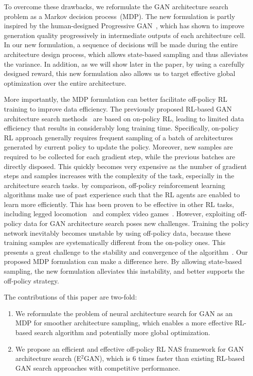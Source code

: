 \documentclass[runningheads]{llncs}
\begin{document}
To overcome these drawbacks, we reformulate the GAN architecture search problem as a Markov decision process~(MDP). The new formulation is partly inspired by the human-designed Progressive GAN~\cite{karras2017progressive}, which has shown to improve generation quality progressively in intermediate outputs of each architecture cell. In our new formulation, a sequence of decisions will be made during the entire architecture design process, which allows state-based sampling and thus alleviates the variance. In addition, as we will show later in the paper, by using a carefully designed reward, this new formulation also allows us to target effective global optimization over the entire architecture.   


More importantly, the MDP formulation can better facilitate off-policy RL training to improve data efficiency. The previously proposed RL-based GAN architecture search methods~\cite{gong2019autogan,wang2019agan} are based on on-policy RL, leading to limited data efficiency that results in considerably long training time. 
Specifically, on-policy RL approach generally requires frequent sampling of a batch of architectures generated by current policy to update the policy.
Moreover, new samples are required to be collected for each gradient step, while the previous batches are directly disposed. This quickly becomes very expensive as the number of gradient steps and samples increases with the complexity of the task, especially in the architecture search tasks. by comparison, off-policy reinforcement learning algorithms make use of past experience such that the RL agents are enabled to learn more efficiently. This has been proven to be effective in other RL tasks, including legged locomotion~\cite{lillicrap2015continuous} and complex video games~\cite{mnih2015human}. However, exploiting off-policy data for GAN architecture search poses new challenges. Training the policy network inevitably becomes unstable by using off-policy data, because these training samples are systematically different from the on-policy ones. This presents a great challenge to the stability and convergence of the algorithm~\cite{bhatnagar2009convergent}. Our proposed MDP formulation can make a difference here. By allowing state-based sampling, the new formulation alleviates this instability, and better supports the off-policy strategy. 


The contributions of this paper are two-fold: 


\begin{enumerate}
   \item We reformulate the problem of neural architecture search for GAN as an MDP for smoother architecture sampling, which enables a more effective RL-based search algorithm and potentially more global optimization.
  \item We propose an efficient and effective off-policy RL NAS framework for GAN architecture search (E$^2$GAN), which is 6 times faster than existing RL-based GAN search approaches with competitive performance. 
\end{enumerate}
\end{document}
